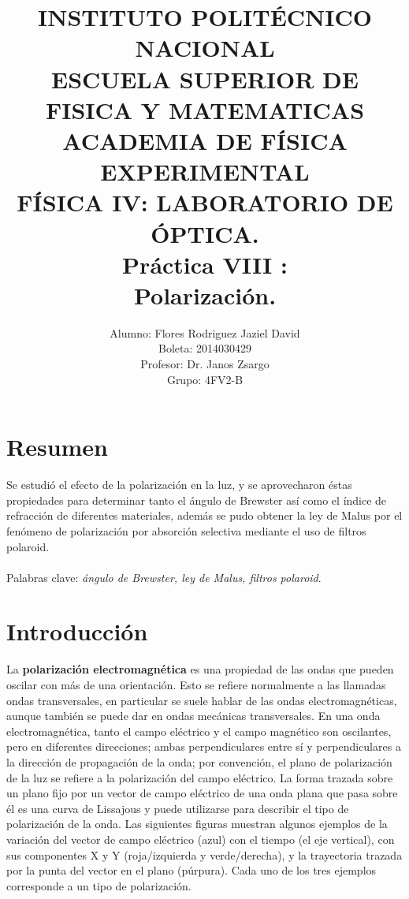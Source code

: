 \documentclass[13,twocolumn,letterpaper]{article}
\title{
    		\usefont{OT1}{bch}{b}{n}
    		\normalfont \normalsize \textsc{INSTITUTO POLITÉCNICO NACIONAL \\ 
    		ESCUELA SUPERIOR DE FISICA Y MATEMATICAS \\
    		ACADEMIA DE FÍSICA EXPERIMENTAL} \\ 
    		FÍSICA IV: LABORATORIO DE ÓPTICA. \\[10pt]
    		\huge Práctica VIII :\\
  Polarización.\\
    }
\author[0]{Alumno: Flores Rodriguez Jaziel David \\
    Boleta: 2014030429 \\
    Profesor: Dr. Janos Zsargo\\
    Grupo: 4FV2-B \\
            }
\begin{document}
    
    \maketitle
   
    
    \section*{Resumen}
   Se estudió el efecto de la polarización en la luz, y se aprovecharon éstas propiedades para determinar tanto el ángulo de Brewster así como el índice de refracción de diferentes materiales, además se pudo obtener la ley de Malus	por el fenómeno de polarización por absorción selectiva mediante el uso de filtros polaroid.  \\\\	Palabras clave: \emph{ángulo de Brewster, ley de Malus, filtros polaroid}. \\ 



	\section*{Introducción}
		 La \textbf{polarizaci\'on electromagn\'etica} es una propiedad de las ondas que pueden oscilar con m\'as de una orientaci\'on. Esto se refiere normalmente a las llamadas ondas transversales, en particular se suele hablar de las ondas electromagn\'eticas, aunque tambi\'en se puede dar en ondas mec\'anicas transversales. En una onda electromagn\'etica, tanto el campo el\'ectrico y el campo magn\'etico son oscilantes, pero en diferentes direcciones; ambas perpendiculares entre sí y perpendiculares a la direcci\'on de propagaci\'on de la onda; por convenci\'on, el  plano de polarizaci\'on de la luz se refiere a la polarizaci\'on del campo el\'ectrico.
	La forma trazada sobre un plano fijo por un vector de campo el\'ectrico de una onda plana que pasa sobre \'el es una curva de Lissajous y puede utilizarse para describir el tipo de polarizaci\'on de la onda. Las siguientes figuras muestran algunos ejemplos de la variaci\'on del vector de campo el\'ectrico (azul) con el tiempo (el eje vertical), con sus componentes X y Y (roja/izquierda y verde/derecha), y la trayectoria trazada por la punta del vector en el plano (p\'urpura). Cada uno de los tres ejemplos corresponde a un tipo de polarización.
\end{document}
